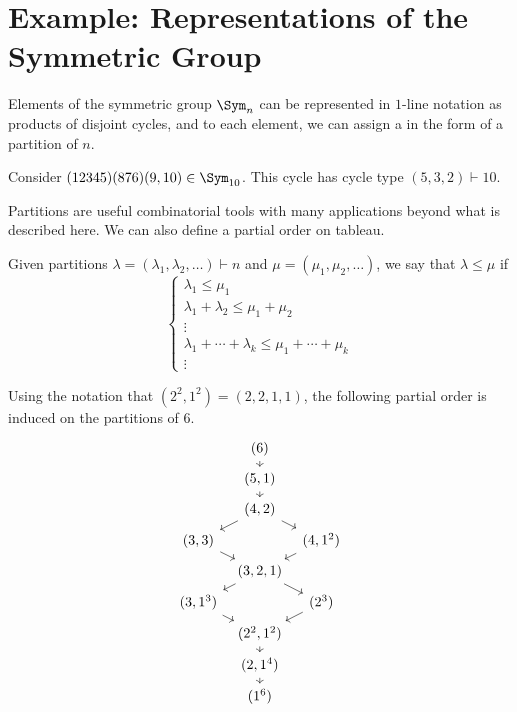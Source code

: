 \documentclass[11pt,leqno,oneside]{amsbook}
\newcommand{\partitionof}{\vdash}
\numberwithin{thm}{section}
\begin{document}
\section{Example: Representations of the Symmetric Group}
Elements of the symmetric group \(\Sym_n\) can be represented in
\(1\)-line notation as products of disjoint cycles, and to each
element, we can assign a  in the form of a partition of
\(n\).
\begin{example}
  Consider \((12345)(876)(9,10) \in \Sym_{10}\). This cycle has cycle
  type \((5,3,2) \partitionof 10\). 
\end{example}
Partitions are useful combinatorial tools with many applications
beyond what is described here. We can also define a partial order on
tableau.
\begin{defn}
  Given partitions \(\lambda = (\lambda_1, \lambda_2,
  \ldots) \partitionof n\) and \(\mu = (\mu_1, \mu_2, \ldots)\), we
  say that \(\lambda \leq \mu\) if \[
    \begin{cases}
      \lambda_1 \leq \mu_1 \\
      \lambda_1 + \lambda_2 \leq \mu_1 + \mu_2 \\
      \vdots\\
      \lambda_1 + \cdots + \lambda_k \leq \mu_1 + \cdots + \mu_k \\
      \vdots
    \end{cases}
  \]
\end{defn}
\begin{example}
  Using the notation that \((2^2,1^2) = (2,2,1,1)\), the following
  partial order is induced on the partitions of \(6\). 
\[  \begin{tikzcd}[row sep=tiny, column sep=tiny]
    & (6) \ar[d] & \\
    & (5,1) \ar[d] & \\
    & (4,2) \ar[ld] \ar[rd] & \\
    (3,3) \ar[rd] & & (4,1^2) \ar[ld] \\
    & (3,2,1) \ar[ld] \ar[rd] & \\
    (3,1^3) \ar[rd]& & (2^3) \ar[ld] \\
    & (2^2, 1^2) \ar[d] & \\
    & (2,1^4) \ar[d] & \\
    & (1^6) &
  \end{tikzcd}
\]
\end{example}
\end{document}
